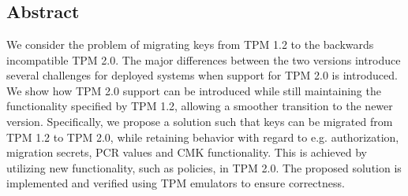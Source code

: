 \chapter[\paperIItitle]{\texorpdfstring{%
		\paperIItitle}{%
		\paperIItitle}}
\label{ch:tpm12to20}
\paperRemark{\paperIIref}


{
%

\renewcommand{\sectionautorefname}{Section}
\renewcommand{\subsectionautorefname}{\sectionautorefname}

\newenvironment{tpmcommands}{\begin{scriptsize}}{\end{scriptsize}}

\newcommand{\tpms}{TPM$_{\text{S}}$}
\newcommand{\tpma}{TPM$_{\text{A}}$}
\newcommand{\tpmd}{TPM$_{\text{D}}$}
\newcommand{\ek}{$K$}
\newcommand{\eksib}{$K_\text{sib}$}
\newcommand{\ca}{TPM$_{\text{C}}$}
\newcommand{\tpmc}[1]{\texttt{#1}}
\newcommand{\tpmco}[1]{\tpmc{TPM\_#1}}
\newcommand{\tpmct}[1]{\tpmc{TPM2\_#1}}
\newcommand{\todo}[1]{\textcolor{red}{\textbf{#1}}}
\def\policychainscalefactor{0.8}

\section*{Abstract}
We consider the problem of migrating keys from TPM 1.2 to the backwards
incompatible TPM 2.0. The major differences between
the two versions introduce several challenges for deployed systems when
support for TPM 2.0 is introduced. We show how TPM 2.0 support can be
introduced while still maintaining the functionality specified by TPM 1.2,
allowing a smoother transition to the newer version. Specifically, we
propose a solution such that keys can be migrated from TPM 1.2 to TPM 2.0,
while retaining behavior with regard to e.g. authorization, migration
secrets, PCR values and CMK functionality. This is achieved by utilizing
new functionality, such as policies, in TPM 2.0. The proposed solution is
implemented and verified using TPM emulators to ensure correctness.

}

